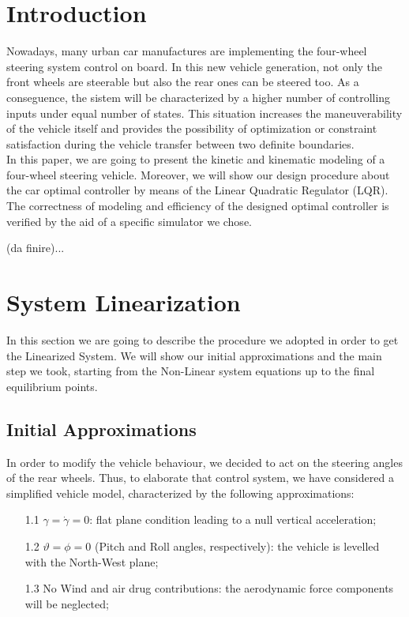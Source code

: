 \documentclass[a4paper,12pt,titlepage]{report}
\begin{document}
	\tableofcontents
\chapter{Introduction}
	Nowadays, many urban car manufactures are implementing the four-wheel steering system control on board. In this new vehicle generation, not only the front wheels are steerable but also the rear ones can be steered too. As a conseguence, the sistem will be characterized by a higher number of controlling inputs under equal number of states. This situation increases the maneuverability of the vehicle itself and provides the possibility of optimization or constraint satisfaction during the vehicle transfer between two definite boundaries.\\
	In this paper, we are going to present the kinetic and kinematic modeling of a four-wheel steering vehicle. Moreover, we will show our design procedure about the car optimal controller by means of the Linear Quadratic Regulator (LQR). The correctness of modeling and efficiency of the designed optimal controller is verified by the aid of a specific simulator we chose.
	
	(da finire)...
\chapter{System Linearization}
	In this section we are going to describe the procedure we adopted in order to get the Linearized System. We will show our initial approximations and the main step we took, starting from the Non-Linear system equations up to the final equilibrium points. 
\section{Initial Approximations} \label{approx}	
	In order to modify the vehicle behaviour, we decided to act on the steering angles of the rear wheels. Thus, to elaborate that control system, we have considered a simplified vehicle model, characterized by the following approximations:
		\begin{itemize}
			\item[1.1] $ \gamma=\dot{\gamma}=0 $: flat plane condition leading to a null vertical acceleration;
			\item[1.2] $\vartheta = \phi = 0$ (Pitch and Roll angles, respectively): the vehicle is levelled with the North-West plane; 
			\item[1.3] No Wind and air drug contributions: the aerodynamic force components will be neglected;
		\end{itemize} 
\end{document}
